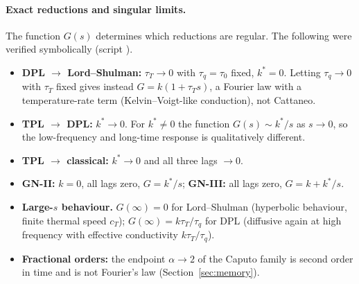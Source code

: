 \paragraph{Exact reductions and singular limits.} The function $G(s)$ determines which reductions are regular. The following were verified symbolically (script ).
\begin{itemize}
\item \textbf{DPL $\to$ Lord--Shulman:} $\tau_T\to0$ with $\tau_q=\tau_0$ fixed, $k^*=0$. Letting $\tau_q\to0$ with $\tau_T$ fixed gives instead $G=k(1+\tau_Ts)$, a Fourier law with a temperature-rate term (Kelvin--Voigt-like conduction), not Cattaneo.
\item \textbf{TPL $\to$ DPL:} $k^*\to0$. For $k^*\ne0$ the function $G(s)\sim k^*/s$ as $s\to0$, so the low-frequency and long-time response is qualitatively different.
\item \textbf{TPL $\to$ classical:} $k^*\to0$ and all three lags $\to0$.
\item \textbf{GN-II:} $k=0$, all lags zero, $G=k^*/s$; \textbf{GN-III:} all lags zero, $G=k+k^*/s$.
\item \textbf{Large-$s$ behaviour.} $G(\infty)=0$ for Lord--Shulman (hyperbolic behaviour, finite thermal speed $c_T$); $G(\infty)=k\tau_T/\tau_q$ for DPL (diffusive again at high frequency with effective conductivity $k\tau_T/\tau_q$).
\item \textbf{Fractional orders:} the endpoint $\alpha\to2$ of the Caputo family is second order in time and is not Fourier's law (Section~\ref{sec:memory}).
\end{itemize}

